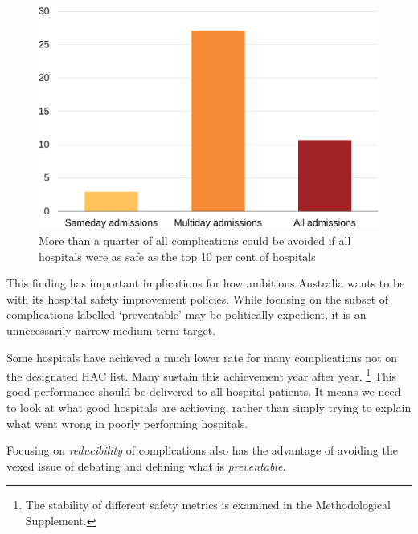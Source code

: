 \documentclass[FrontPage]{grattan}
\begin{document}
\begin{figure}
\caption{More than a quarter of all complications could be avoided if all hospitals were as safe as the top 10 per cent of hospitals}\label{fig:half-complications-could-be-avoided-if-top-decile}
\includegraphics[page=34]{atlas/comps_charts.pdf}
\end{figure}


This finding has important implications for how ambitious Australia wants to be with its hospital safety improvement policies.
While focusing on the subset of complications labelled  `preventable' may be politically expedient, it is an unnecessarily narrow medium-term target.

Some hospitals have achieved a much lower rate for many complications not on the designated HAC list.
Many sustain this achievement year after year.%
	\footnote{The stability of different safety metrics is examined in the Methodological Supplement.}
This good performance should be delivered to all hospital patients.
It means we need to look at what good hospitals are achieving, rather than simply trying to explain what went wrong in poorly performing hospitals.

Focusing on \emph{reducibility} of complications also has the advantage of avoiding the vexed issue of debating and defining what is \emph{preventable}.
\end{document}

